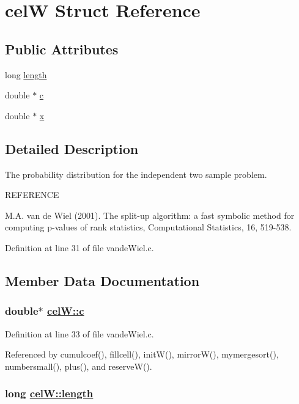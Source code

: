 \hypertarget{structcelW}{
\section{cel\-W Struct Reference}
\label{structcelW}
}
\subsection*{Public Attributes}
\begin{CompactItemize}
\item 
long \hyperlink{structcelW_o0}{length}
\item 
double $\ast$ \hyperlink{structcelW_o1}{c}
\item 
double $\ast$ \hyperlink{structcelW_o2}{x}
\end{CompactItemize}


\subsection{Detailed Description}
The probability distribution for the independent two sample problem.

REFERENCE

M.A. van de Wiel (2001). The split-up algorithm: a fast symbolic method for computing p-values of rank statistics, Computational Statistics, 16, 519-538.



Definition at line 31 of file vande\-Wiel.c.

\subsection{Member Data Documentation}
\hypertarget{structcelW_o1}{
\subsubsection[c]{\setlength{\rightskip}{0pt plus 5cm}double$\ast$ \hyperlink{structcelW_o1}{cel\-W::c}}}
\label{structcelW_o1}




Definition at line 33 of file vande\-Wiel.c.

Referenced by cumulcoef(), fillcell(), init\-W(), mirror\-W(), mymergesort(), numbersmall(), plus(), and reserve\-W().\hypertarget{structcelW_o0}{
\subsubsection[length]{\setlength{\rightskip}{0pt plus 5cm}long \hyperlink{structcelW_o0}{cel\-W::length}}}
\label{structcelW_o0}




